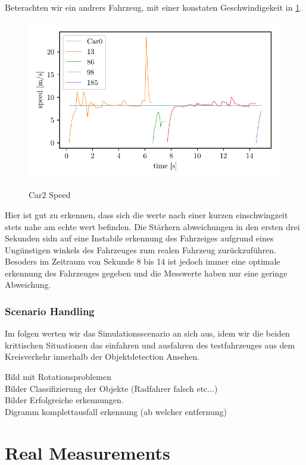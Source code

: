\documentclass[11pt,oneside,openright]{mpreport}
\begin{document}
Beterachten wir ein andrers Fahrzeug, mit einer konstaten Geschwindigekeit in \cref{car0_speed}. 
\begin{figure}[!htb]
  \caption{Car2 Speed} 
  \centering
  \includegraphics[width=\textwidth]{bilder/Car0_speed.pdf}
 \label{car0_speed}
\end{figure}
Hier ist gut zu erkennen, dass sich die werte nach einer kurzen einschwingzeit stets nahe am echte wert befinden. Die Stärkern abweichungen in den ersten drei Sekunden sidn auf eine Instabile
erkennung des Fahrzeiges aufgrund eines Ungünstigen winkels des Fahrzeuges zum realen Fahrzeug zurückzuführen.  Besoders im Zeitraum von Sekunde 8 bis 14 ist jedoch immer eine optimale
erkennung des Fahrzeuges gegeben und die Messwerte haben nur eine geringe Abweichung.


\subsubsection{Scenario Handling}
Im folgen werten wir das Simulationsscenario an sich aus, idem wir die beiden krittischen Situationen das einfahren und ausfahren des testfahrzeuges aus dem Kreisverkehr 
innerhalb der Objektdetection Ansehen.


Bild mit Rotationsproblemen\\


Bilder Classifizierung der Objekte (Radfahrer falsch etc...)\\

Bilder Erfolgreiche erkennungen.\\

Digramm komplettausfall erkennung (ab welcher entfernung)\\

\section{Real Measurements}
\end{document}
